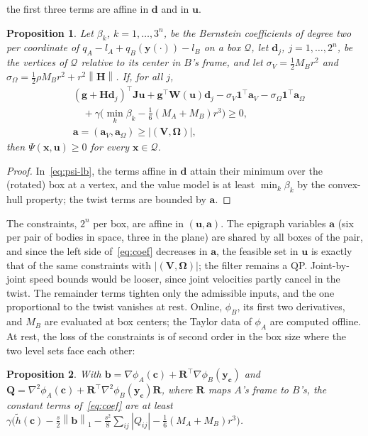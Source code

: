\documentclass[journal]{IEEEtran}
\newtheorem{proposition}{Proposition}
\theoremstyle{definition}
\newcommand{\norm}[1]{\left\lVert #1\right\rVert}
\newcommand{\Rot}{\mathbf{R}}
\begin{document}
the first three terms are affine in $\mathbf d$ and in $\mathbf u$.
\begin{proposition}\label{prop:coef}
Let $\beta_k$, $k=1,\dots,3^n$, be the Bernstein coefficients of degree two per coordinate of
$q_A-l_A+q_B(\mathbf y(\cdot))-l_B$ on a box $\mathcal Q$, let $\mathbf d_j$, $j=1,\dots,2^n$, be the
vertices of $\mathcal Q$ relative to its center in $B$'s frame, and let
$\sigma_V=\frac12M_Br^2$ and $\sigma_\Omega=\frac12\rho M_Br^2+r^2\norm{\mathbf H}$. If, for all $j$,
\begin{equation}\label{eq:coef}
\begin{aligned}
&(\mathbf g+\mathbf H\mathbf d_j)^\top\mathbf J\mathbf u+\mathbf g^\top\mathbf W(\mathbf u)\mathbf d_j
-\sigma_V\mathbf 1^{\!\top}\mathbf a_V-\sigma_\Omega\mathbf 1^{\!\top}\mathbf a_\Omega\\
&\quad+\gamma\big(\min_k\beta_k-\tfrac16(M_A+M_B)r^3\big)\ge0,\\
&\mathbf a=(\mathbf a_V,\mathbf a_\Omega)\ge|(\mathbf V,\boldsymbol\Omega)|,
\end{aligned}
\end{equation}
then $\Psi(\mathbf x,\mathbf u)\ge0$ for every $\mathbf x\in\mathcal Q$.
\end{proposition}
\begin{proof}
In~\eqref{eq:psi-lb}, the terms affine in $\mathbf d$ attain their minimum over the (rotated) box at a
vertex, and the value model is at least $\min_k\beta_k$ by the convex-hull property; the twist terms
are bounded by $\mathbf a$.
\end{proof}
The constraints, $2^n$ per box, are affine in $(\mathbf u,\mathbf a)$. The epigraph variables $\mathbf a$ (six per pair of
bodies in space, three in the plane) are shared by all boxes of the pair, and since the left side
of~\eqref{eq:coef} decreases in $\mathbf a$, the feasible set in $\mathbf u$ is exactly that of the same
constraints with $|(\mathbf V,\boldsymbol\Omega)|$; the filter remains a QP. Joint-by-joint speed bounds
would be looser, since joint velocities partly cancel in the twist.
The remainder terms tighten only the admissible inputs, and the one
proportional to the twist vanishes at rest. Online, $\phi_B$, its first two derivatives, and $M_B$ are
evaluated at box centers; the Taylor data of $\phi_A$ are computed offline. At rest, the loss of the
constraints is of second order in the box size where the two level sets face each other:
\begin{proposition}\label{prop:tight}
With $\mathbf b=\nabla\phi_A(\mathbf c)+\Rot^\top\nabla\phi_B(\mathbf y_{\mathbf c})$ and
$\mathbf Q=\nabla^2\phi_A(\mathbf c)+\Rot^\top\nabla^2\phi_B(\mathbf y_{\mathbf c})\Rot$, where
$\Rot$ maps $A$'s frame to $B$'s, the constant terms of~\eqref{eq:coef} are at least
$\gamma\big(\tilde h(\mathbf c)-\tfrac s2\norm{\mathbf b}_1-\tfrac{s^2}8\sum_{ij}|Q_{ij}|
-\tfrac16(M_A+M_B)r^3\big)$.
\end{proposition}
\end{document}
